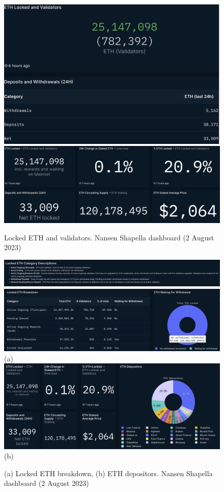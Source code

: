 \documentclass[UTF8]{article}
\begin{document}
{\begin{figure}[htbp]
\begin{center}
\includegraphics[width=0.45\linewidth]{images/nansen2}
\includegraphics[width=0.45\linewidth]{images/nansen6}
\caption{Locked ETH and validators. Nansen Shapella dashboard (2 August 2023)}
\label{fig:nansen2}
\end{center}
\end{figure}

\begin{figure}[htbp]
\begin{center}
\includegraphics[width=\linewidth]{images/nansen3a} \\
\includegraphics[width=\linewidth]{images/nansen8}\\
(a)\\
\includegraphics[width=\linewidth]{images/nansen5}\\
(b)
\caption{(a) Locked ETH breakdown, (b) ETH depositors. Nansen Shapella dashboard (2 August 2023)}
\label{fig:nansen3}
\end{center}
\end{figure}

}
\end{document}
